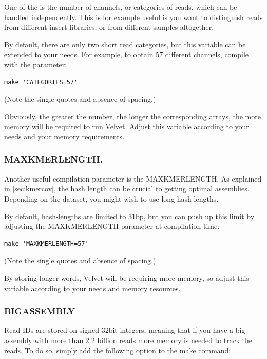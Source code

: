 \documentclass{article}
\begin{document}
One of the is the number of channels, or categories of reads, which can be handled independently. This is for example useful is you want to distinguish reads from different insert libraries, or from different samples altogether.

By default, there are only two short read categories, but this variable can be extended to your needs. For example, to obtain 57 different channels, compile with the parameter:

\begin{verbatim}
make 'CATEGORIES=57'
\end{verbatim}

(Note the single quotes and absence of spacing.)

Obviously, the greater the number, the longer the corresponding arrays, the more memory will be required to run Velvet. Adjust this variable according to your needs and your memory requirements. 

\subsubsection{MAXKMERLENGTH.}

\label{sec:maxlength}

Another useful compilation parameter is the MAXKMERLENGTH. As explained in \ref{sec:kmercov}, the hash length can be crucial to getting optimal assemblies. Depending on the dataset, you might wish to use long hash lengths. 

By default, hash-lengths are limited to 31bp, but you can push up this limit by adjusting the MAXKMERLENGTH parameter at compilation time:

\begin{verbatim}
make 'MAXKMERLENGTH=57'
\end{verbatim}

(Note the single quotes and absence of spacing.)

By storing longer words, Velvet will be requiring more memory, so adjust this variable according to your needs and memory resources. 

\subsubsection{BIGASSEMBLY}

Read IDs are stored on signed 32bit integers, meaning that if you have a big assembly with more than 2.2 billion reads more memory is needed to track the reads. To do so, simply add the following option to the make command:
\end{document}
